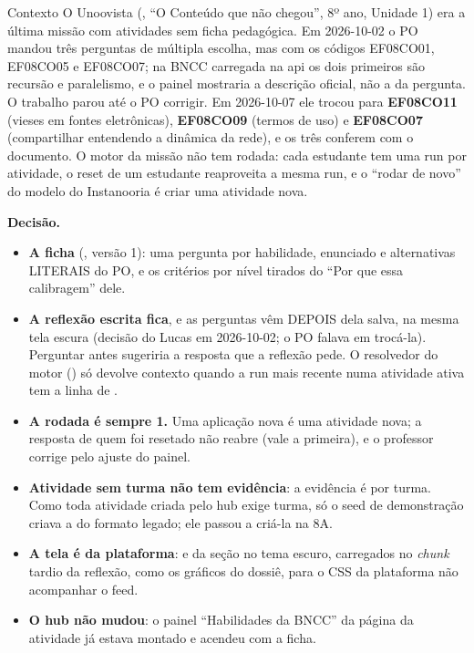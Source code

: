 \begin{especificacao}{Contexto}
O Unoovista (, \enquote{O Conteúdo que não chegou}, 8º ano,
Unidade 1) era a última missão com atividades sem ficha pedagógica. Em
2026-10-02 o PO mandou três perguntas de múltipla escolha, mas com os códigos
EF08CO01, EF08CO05 e EF08CO07; na BNCC carregada na api os dois primeiros são
recursão e paralelismo, e o painel mostraria a descrição oficial, não a da
pergunta. O trabalho parou até o PO corrigir. Em 2026-10-07 ele trocou para
\textbf{EF08CO11} (vieses em fontes eletrônicas), \textbf{EF08CO09} (termos de
uso) e \textbf{EF08CO07} (compartilhar entendendo a dinâmica da rede), e os
três conferem com o documento. O motor da missão não tem rodada: cada estudante
tem uma run por atividade, o reset de um estudante reaproveita a mesma run, e o
\enquote{rodar de novo} do modelo do Instanooria é criar uma atividade nova.
\end{especificacao}

\textbf{Decisão.}

\begin{itemize}
  \item \textbf{A ficha} (, versão 1):
    uma pergunta por habilidade, enunciado e alternativas LITERAIS do PO, e os
    critérios por nível tirados do \enquote{Por que essa calibragem} dele.
  \item \textbf{A reflexão escrita fica}, e as perguntas vêm DEPOIS dela salva,
    na mesma tela escura (decisão do Lucas em 2026-10-02; o PO falava em
    trocá-la). Perguntar antes sugeriria a resposta que a reflexão pede. O
    resolvedor do motor () só devolve
    contexto quando a run mais recente numa atividade ativa tem a linha de
    .
  \item \textbf{A rodada é sempre 1.} Uma aplicação nova é uma atividade nova;
    a resposta de quem foi resetado não reabre (vale a primeira), e o professor
    corrige pelo ajuste do painel.
  \item \textbf{Atividade sem turma não tem evidência}: a evidência é por
    turma. Como toda atividade criada pelo hub exige turma, só o seed de
    demonstração criava a do formato legado; ele passou a criá-la na 8A.
  \item \textbf{A tela é da plataforma}:  e  da seção
     no tema escuro, carregados no \emph{chunk} tardio da reflexão,
    como os gráficos do dossiê, para o CSS da plataforma não acompanhar o feed.
  \item \textbf{O hub não mudou}: o painel \enquote{Habilidades da BNCC} da
    página da atividade já estava montado e acendeu com a ficha.
\end{itemize}

